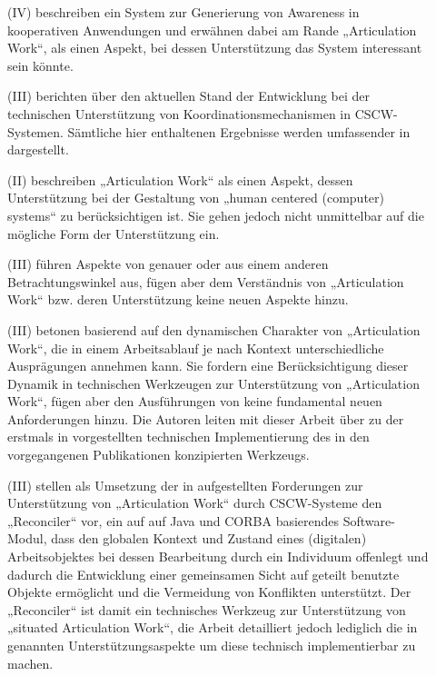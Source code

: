\begin{description}
	\item[\citep{Simone97}] (IV) beschreiben ein System zur Generierung von Awareness in kooperativen Anwendungen und erwähnen dabei am Rande „Articulation Work“, als einen Aspekt, bei dessen Unterstützung das System interessant sein könnte.
	\item[\citet{Simone97a}] (III) berichten über den aktuellen Stand der Entwicklung bei der technischen Unterstützung von Koordinationsmechanismen in CSCW-Systemen. Sämtliche hier enthaltenen Ergebnisse werden umfassender in \citep{Divitini00} dargestellt.
	\item[\citet{Kling98}] (II) beschreiben „Articulation Work“ als einen Aspekt, dessen Unterstützung bei der Gestaltung von „human centered (computer) systems“ zu berücksichtigen ist. Sie gehen jedoch nicht unmittelbar auf die mögliche Form der Unterstützung ein.
	\item[\citet{Carstensen99}] (III) führen Aspekte von \citep{Schmidt96} genauer oder aus einem anderen Betrachtungswinkel aus, fügen aber dem Verständnis von „Articulation Work“ bzw. deren Unterstützung keine neuen Aspekte hinzu.
	\item[\citet{Schmidt99}] (III) betonen basierend auf \citep{Schmidt96} den dynamischen Charakter von „Articulation Work“, die in einem Arbeitsablauf je nach Kontext unterschiedliche Ausprägungen annehmen kann. Sie fordern eine Berücksichtigung dieser Dynamik in technischen Werkzeugen zur Unterstützung von „Articulation Work“, fügen aber den Ausführungen von \citep{Schmidt96} keine fundamental neuen Anforderungen hinzu. Die Autoren leiten mit dieser Arbeit über zu der erstmals in \citet{Simone99} vorgestellten technischen Implementierung des in den vorgegangenen Publikationen konzipierten Werkzeugs.
	\item[\citet{Simone99}] (III) stellen als Umsetzung der in \citep{Schmidt96} aufgestellten Forderungen zur Unterstützung von „Articulation Work“ durch \gls{CSCW}-Systeme den „Reconciler“ vor, ein auf auf Java und \gls{CORBA} basierendes Software-Modul, dass den globalen Kontext und Zustand eines (digitalen) Arbeitsobjektes bei dessen Bearbeitung durch ein Individuum offenlegt und dadurch die Entwicklung einer gemeinsamen Sicht auf geteilt benutzte Objekte ermöglicht und die Vermeidung von Konflikten unterstützt. Der „Reconciler“ ist damit ein technisches Werkzeug zur Unterstützung von „situated Articulation Work“, die Arbeit detailliert jedoch lediglich die in \citep{Schmidt96} genannten Unterstützungsaspekte um diese technisch implementierbar zu machen.

\end{description}
